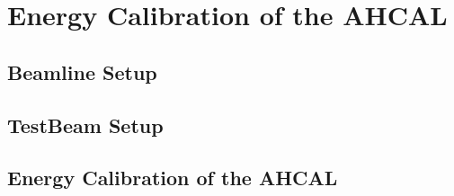 \chapter{Energy Calibration of the AHCAL}

\section{Beamline Setup}

\section{TestBeam Setup}

\section{Energy Calibration of the AHCAL}
